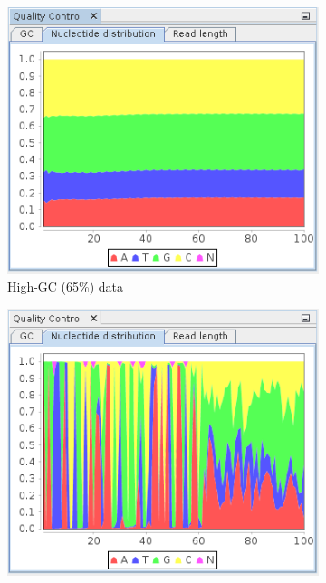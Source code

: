 \begin{figure}
        \centering
        \begin{subfigure}[b]{0.3\textwidth}
                \includegraphics[width=\textwidth]{img/mgx/highGCnucl}
                \caption{High-GC (65\%) data}
        \end{subfigure}%
        \begin{subfigure}[b]{0.3\textwidth}
                \includegraphics[width=\textwidth]{img/mgx/ampliconNucl}

\end{subfigure}
\end{figure}

